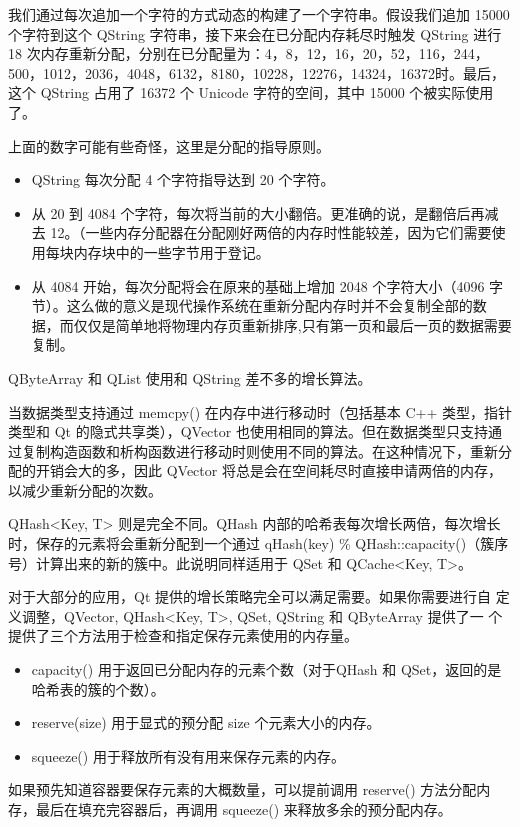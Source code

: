 我们通过每次追加一个字符的方式动态的构建了一个字符串。假设我们追加 15000 个字符到这个 QString 字符串，接下来会在已分配内存耗尽时触发 QString 进行 18 次内存重新分配，分别在已分配量为：4，8，12，16，20，52，116，244，500，1012，2036，4048，6132，8180，10228，12276，14324，16372时。最后，这个 QString 占用了 16372 个 Unicode 字符的空间，其中 15000 个被实际使用了。

上面的数字可能有些奇怪，这里是分配的指导原则。

\begin{itemize}
\item QString 每次分配 4 个字符指导达到 20 个字符。
\item 从 20 到 4084 个字符，每次将当前的大小翻倍。更准确的说，是翻倍后再减去 12。（一些内存分配器在分配刚好两倍的内存时性能较差，因为它们需要使用每块内存块中的一些字节用于登记。
\item 从 4084 开始，每次分配将会在原来的基础上增加 2048 个字符大小（4096 字节）。这么做的意义是现代操作系统在重新分配内存时并不会复制全部的数据，而仅仅是简单地将物理内存页重新排序,只有第一页和最后一页的数据需要复制。
\end{itemize}

QByteArray 和 QList 使用和 QString 差不多的增长算法。

当数据类型支持通过 memcpy() 在内存中进行移动时（包括基本 C++ 类型，指针类型和 Qt 的隐式共享类），QVector 也使用相同的算法。但在数据类型只支持通过复制构造函数和析构函数进行移动时则使用不同的算法。在这种情况下，重新分配的开销会大的多，因此 QVector 将总是会在空间耗尽时直接申请两倍的内存，以减少重新分配的次数。

QHash<Key, T> 则是完全不同。QHash 内部的哈希表每次增长两倍，每次增长时，保存的元素将会重新分配到一个通过 qHash(key) \% QHash::capacity()（簇序号）计算出来的新的簇中。此说明同样适用于 QSet 和 QCache<Key, T>。

对于大部分的应用，Qt 提供的增长策略完全可以满足需要。如果你需要进行自
定义调整，QVector, QHash<Key, T>, QSet, QString 和 QByteArray 提供了一
个提供了三个方法用于检查和指定保存元素使用的内存量。

\begin{itemize}
\item capacity() 用于返回已分配内存的元素个数（对于QHash 和 QSet，返回的是哈希表的簇的个数）。
\item reserve(size) 用于显式的预分配 size 个元素大小的内存。
\item squeeze() 用于释放所有没有用来保存元素的内存。
\end{itemize}

如果预先知道容器要保存元素的大概数量，可以提前调用 reserve() 方法分配内存，最后在填充完容器后，再调用 squeeze() 来释放多余的预分配内存。

